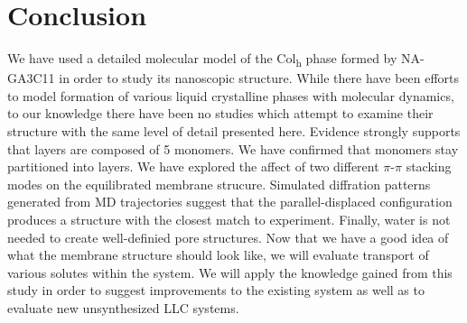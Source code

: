 \documentclass{article}
\begin{document}
  \section*{Conclusion}
  
  We have used a detailed molecular model of the Col\textsubscript{h} phase
  formed by NA-GA3C11 in order to study its nanoscopic structure. While there
  have been efforts to model formation of various liquid crystalline phases with
  molecular dynamics, to our knowledge there have been no studies which attempt
  to examine their structure with the same level of detail presented here.
  Evidence strongly supports that layers are composed of 5 monomers. We have
  confirmed that monomers stay partitioned into layers. We have explored the
  affect of two different $\pi$-$\pi$ stacking modes on the equilibrated membrane
  strucure. Simulated diffration patterns generated from MD trajectories suggest
  that the parallel-displaced configuration produces a structure with the closest
  match to experiment. Finally, water is not needed to create well-definied pore
  structures. Now that we have a good idea of what the membrane structure should
  look like, we will evaluate transport of various solutes within the system. We
  will apply the knowledge gained from this study in order to suggest
  improvements to the existing system as well as to evaluate new unsynthesized
  LLC systems.

  \clearpage
  
\end{document}

